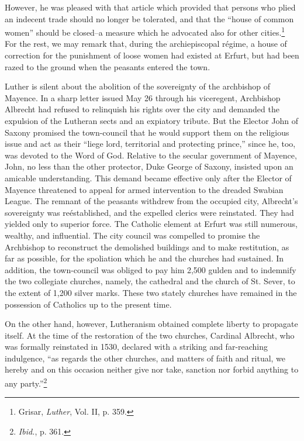 However, he was pleased with that article which provided that
persons who plied an indecent trade should no longer be tolerated,
and that the “house of common women” should be closed--a measure
which he advocated also for other cities.\footnote{Grisar, \textit{Luther}, Vol. II, p. 359.}
For the rest, we may remark
that, during the archiepiscopal régime, a house of correction
for the punishment of loose women had existed at Erfurt, but had
been razed to the ground when the peasants entered the town.

Luther is silent about the abolition of the sovereignty of the
archbishop of Mayence. In a sharp letter issued May 26 through
his viceregent, Archbishop Albrecht had refused to relinquish his
rights over the city and demanded the expulsion of the Lutheran
sects and an expiatory tribute. But the Elector John of Saxony
promised the town-council that he would support them on the religious
issue and act as their “liege lord, territorial and protecting
prince,” since he, too, was devoted to the Word of God. Relative
to the secular government of Mayence, John, no less than the other
protector, Duke George of Saxony, insisted upon an amicable understanding.
This demand became effective only after the Elector of
Mayence threatened to appeal for armed intervention to the dreaded
Swabian League. The remnant of the peasants withdrew from the
occupied city, Albrecht’s sovereignty was reéstablished, and the expelled
clerics were reinstated. They had yielded only to superior
force. The Catholic element at Erfurt was still numerous, wealthy,
and influential. The city council was compelled to promise the
Archbishop to reconstruct the demolished buildings and to make
restitution, as far as possible, for the spoliation which he and the
churches had sustained. In addition, the town-council was obliged
to pay him 2,500 gulden and to indemnify the two collegiate churches,
namely, the cathedral and the church of St. Sever, to the extent of
1,200 silver marks. These two stately churches have remained in
the possession of Catholics up to the present time.

On the other hand, however, Lutheranism obtained complete liberty to propagate
itself. At the time of the restoration of the two
churches, Cardinal Albrecht, who was formally reinstated in 1530,
declared with a striking and far-reaching indulgence, “as regards the
other churches, and matters of faith and ritual, we hereby and on this
occasion neither give nor take, sanction nor forbid anything to any
party.”\footnote{\textit{Ibid.}, p. 361.}

